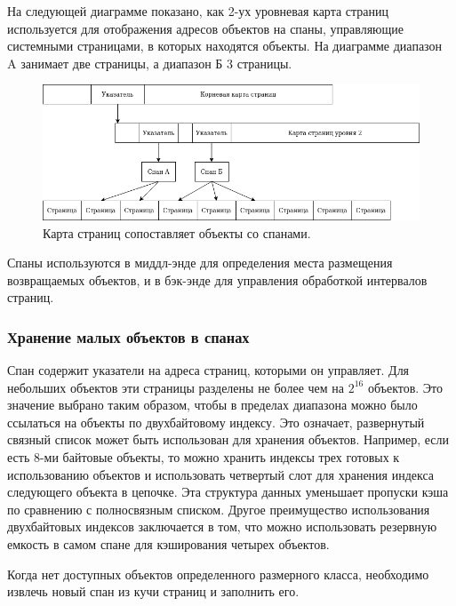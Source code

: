 На следующей диаграмме показано, как 2-ух уровневая карта страниц используется для отображения адресов объектов на спаны, управляющие системными страницами, в которых находятся объекты. На диаграмме диапазон A занимает две страницы, а диапазон Б 3 страницы.

\begin{figure}[!h]
	\begin{center}
		\includegraphics[scale=0.6]{images/tcmalloc-pagemap-and-spans.png}
		\caption{Карта страниц сопоставляет объекты со спанами.}
		\label{tcmalloc-pagemap-and-spans}
	\end{center}
\end{figure}

Спаны используются в миддл-энде для определения места размещения возвращаемых объектов, и в бэк-энде для управления обработкой интервалов страниц.

\subsubsection{Хранение малых объектов в спанах}

Спан содержит указатели на адреса страниц, которыми он управляет. Для небольших объектов эти страницы разделены не более чем на $2^{16}$ объектов. Это значение выбрано таким образом, чтобы в пределах диапазона можно было ссылаться на объекты по двухбайтовому индексу. Это означает, развернутый связный список может быть использован для хранения объектов. Например, если есть 8-ми байтовые объекты, то можно хранить индексы трех готовых к использованию объектов и использовать четвертый слот для хранения индекса следующего объекта в цепочке. Эта структура данных уменьшает пропуски кэша по сравнению с полносвязным списком. Другое преимущество использования двухбайтовых индексов заключается в том, что можно использовать резервную емкость в самом спане для кэширования четырех объектов.

Когда нет доступных объектов определенного размерного класса, необходимо извлечь новый спан из кучи страниц и заполнить его.

